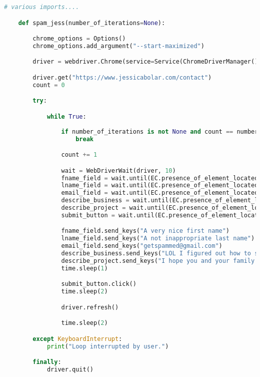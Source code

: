\begin{lstlisting}[language=Python]
    # various imports....

    def spam_jess(number_of_iterations=None):

        chrome_options = Options()
        chrome_options.add_argument("--start-maximized")  

        driver = webdriver.Chrome(service=Service(ChromeDriverManager().install()), options=chrome_options)

        driver.get("https://www.jessicabolar.com/contact")
        count = 0

        try:

            while True:
                
                if number_of_iterations is not None and count == number_of_iterations:
                    break

                count += 1

                wait = WebDriverWait(driver, 10)
                fname_field = wait.until(EC.presence_of_element_located((By.ID, "placeholder")))
                lname_field = wait.until(EC.presence_of_element_located((By.ID, "placeholder")))
                email_field = wait.until(EC.presence_of_element_located((By.ID, "placeholder")))
                describe_business = wait.until(EC.presence_of_element_located((By.ID, "placeholder")))  
                describe_project = wait.until(EC.presence_of_element_located((By.ID, "placeholder")))
                submit_button = wait.until(EC.presence_of_element_located((By.XPATH, "//button[@type='submit']")))

                fname_field.send_keys("A very nice first name")
                lname_field.send_keys("A not inappropriate last name")
                email_field.send_keys("getspammed@gmail.com")
                describe_business.send_keys("LOL I figured out how to spam ur website")
                describe_project.send_keys("I hope you and your family have pleasant evenings")
                time.sleep(1)  

                submit_button.click()
                time.sleep(2)

                driver.refresh()

                time.sleep(2)

        except KeyboardInterrupt:
            print("Loop interrupted by user.")

        finally:
            driver.quit()

\end{lstlisting}